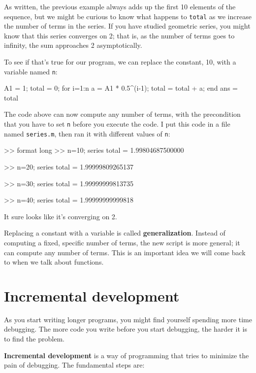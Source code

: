 \documentclass[
]{book}
\numberwithin{Answer}{chapter}
\numberwithin{Exercise}{chapter}
\begin{document}
As written, the previous example always adds up the first 10
elements of the sequence, but we might be curious to know what
happens to {\tt total} as we increase the
number of terms in the series.  If you have studied geometric
series, you might know that this series converges on 2; that is,
as the number of terms goes to infinity, the sum approaches
2 asymptotically.

To see if that's true for our program, we can replace the
constant, 10, with a variable named {\tt n}:

\begin{code}
A1 = 1;
total = 0;
for i=1:n
    a = A1 * 0.5^(i-1);
    total = total + a;
end
ans = total
\end{code}

The code above can now compute any number of terms, with the
precondition that you have to set {\tt n} before you execute
the code.  
I put this code in a file named {\tt series.m}, then
ran it with different values of {\tt n}:

\begin{code}
>> format long
>> n=10; series
total = 1.99804687500000

>> n=20; series
total = 1.99999809265137

>> n=30; series
total = 1.99999999813735

>> n=40; series
total = 1.99999999999818
\end{code}

It sure looks like it's converging on 2.

Replacing a constant with a variable is called {\bf generalization}.
Instead of computing a fixed, specific number of terms, the new script
is more general; it can compute any number of terms.
This is an important idea we will come back to when we talk about functions.

\section{Incremental development}


As you start writing longer programs, you might find yourself spending more time debugging.
The more code you write before you start debugging, the harder it is to find
the problem.

{\bf Incremental development} is a way of programming that tries
to minimize the pain of debugging.  The fundamental steps are:
\end{document}
